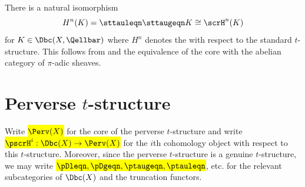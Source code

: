 

\begin{claim}
    There is a natural isomorphism
    $$H^n(K) = \sttauleqn \sttaugeqn K \cong \scrH^n(K)$$
    for $K \in \Dbc(X, \Qellbar)$ where $H^n$ denotes the  with respect to the standard $t$-structure. This follows from {\cite[Remark p.\,104]{kiehl_weissauer_wcps}} and the equivalence of the core with the abelian category of $\pi$-adic sheaves.
\end{claim}

\section{Perverse \texorpdfstring{$t$}{t}-structure}












Write \hl{$\Perv(X)$} for the core of the perverse $t$-structure and write \hl{$\pscrH^i: \Dbc(X) \to \Perv(X)$} for the $i$th cohomology object with respect to this $t$-structure. Moreover, since the perverse $t$-structure is a genuine $t$-structure, we may write \hl{$\pDleqn, \pDgeqn, \ptaugeqn, \ptauleqn$}, etc. for the relevant subcategories of $\Dbc(X)$ and the truncation functors. 

